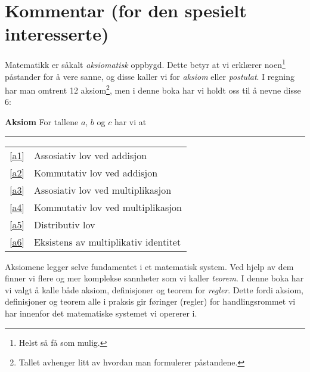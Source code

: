 



	
\section*{Kommentar (for den spesielt interesserte) \label{Kommentar1}}
Matematikk er såkalt \textit{aksiomatisk} oppbygd. Dette betyr at vi erklærer noen\footnote{Helst så få som mulig.} påstander for å vere sanne, og disse kaller vi for \textit{aksiom} eller \textit{postulat}. I regning har man omtrent 12 aksiom\footnote{Tallet avhenger litt av hvordan man formulerer påstandene.}, men i denne boka har vi holdt oss til å nevne disse 6:
\regv 

\begin{tcolorbox}[boxrule=0.3 mm,arc=0mm,colback=blue!5] {\large \textbf{Aksiom} \vspace{5 pt}}\newline
For tallene $ a $, $ b $ og $ c $ har vi at
\rule{1\linewidth}{0.75bp}
\begin{center}
	\begin{tabular}{rl}
		\eqref{a1} &Assosiativ lov ved addisjon\\
		\eqref{a2} & Kommutativ lov ved addisjon \\	
		\eqref{a3} & Assosiativ lov ved multiplikasjon \\
		\eqref{a4} & Kommutativ lov ved multiplikasjon \\		
		\eqref{a5} & Distributiv lov\\	
		\eqref{a6} & Eksistens av multiplikativ identitet
	\end{tabular}
\end{center}
\end{tcolorbox}
\vsk
Aksiomene legger selve fundamentet i et matematisk system. Ved hjelp av dem finner vi flere og mer komplekse sannheter som vi kaller \textit{teorem}. I denne boka har vi valgt å kalle både aksiom, definisjoner og teorem for \textsl{regler}. Dette fordi aksiom, definisjoner og teorem alle i praksis gir føringer (regler) for handlingsrommet vi har innenfor det matematiske systemet vi opererer i.\vsk
